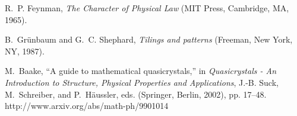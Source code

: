 \documentclass[rmp,amssymb,showpacs,showkeys,12pt,preprint]{revtex4}
\begin{document}
\begin{thebibliography}{10}
R.~P. Feynman, {\em The Character of Physical Law\/} (MIT Press, Cambridge, MA,
  1965).

B.~Gr{\"{u}}nbaum and G.~C. Shephard, {\em Tilings and patterns\/} (Freeman,
  New York, NY, 1987).

M.~Baake, \enquote{A guide to mathematical quasicrystals,} in {\em
  Quasicrystals - An Introduction to Structure, Physical Properties and
  Applications\/}, J.-B. Suck, M.~Schreiber, and P.~H{\"{a}}ussler, eds.
  (Springer, Berlin, 2002), pp. 17--48.
\newline http://www.arxiv.org/abs/math-ph/9901014

\end{thebibliography}
\end{document}
